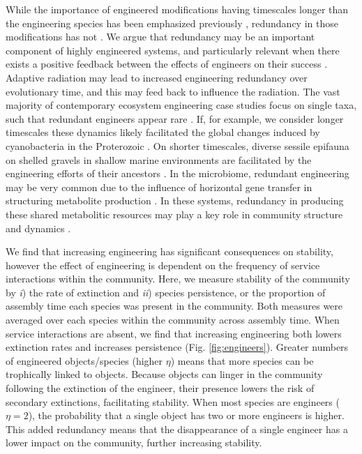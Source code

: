 \documentclass[9pt,twocolumn,twoside]{pnas-new}
\begin{document}
While the importance of engineered modifications having timescales longer than the engineering species has been emphasized previously \cite{Hastings2007}, redundancy in those modifications has not \cite{Lawton1994}.
We argue that redundancy may be an important component of highly engineered systems, and particularly relevant when there exists a positive feedback between the effects of engineers on their success \cite{Cuddington2004}.
Adaptive radiation may lead to increased engineering redundancy over evolutionary time, and this may feed back to influence the radiation.
The vast majority of contemporary ecosystem engineering case studies focus on single taxa, such that redundant engineers appear rare \cite{Lawton1994}.
If, for example, we consider longer timescales these dynamics likely facilitated the global changes induced by cyanobacteria in the Proterozoic \cite{Schirrmeister2013}.
On shorter timescales, diverse sessile epifauna on shelled gravels in shallow marine environments are facilitated by the engineering efforts of their ancestors \cite{Kidwell1986}.
In the microbiome, redundant engineering may be very common due to the influence of horizontal gene transfer in structuring metabolite production \cite{Polz2013}.
In these systems, redundancy in producing these shared metabolitic resources may play a key role in community structure and dynamics \cite{Kallus2017,Muscarella2017}.



We find that increasing engineering has significant consequences on stability, however the effect of engineering is dependent on the frequency of service interactions within the community.
Here, we measure stability of the community by 
\emph{i}) the rate of extinction and
\emph{ii}) species persistence, or the proportion of assembly time each species was present in the community.
Both measures were averaged over each species within the community across assembly time.
When service interactions are absent, we find that increasing engineering both lowers extinction rates and increases persistence (Fig. \ref{fig:engineers}).
Greater numbers of engineered objects/species (higher $\eta$) means that more species can be trophically linked to objects.
Because objects can linger in the community following the extinction of the engineer, their presence lowers the risk of secondary extinctions, facilitating stability.
When most species are engineers ($\eta = 2$), the probability that a single object has two or more engineers is higher.
This added redundancy means that the disappearance of a single engineer has a lower impact on the community, further increasing stability.
\end{document}

